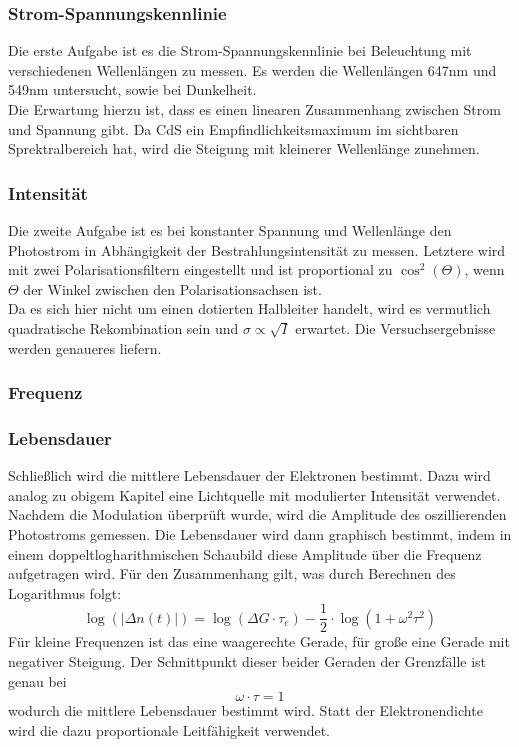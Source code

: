 \subsubsection{Strom-Spannungskennlinie}
Die erste Aufgabe ist es die Strom-Spannungskennlinie bei Beleuchtung mit verschiedenen Wellenlängen zu messen. Es werden die Wellenlängen 647nm und 549nm untersucht, sowie bei Dunkelheit. \\
Die Erwartung hierzu ist, dass es einen linearen Zusammenhang zwischen Strom und Spannung gibt. Da CdS ein Empfindlichkeitsmaximum im sichtbaren Sprektralbereich hat, wird die Steigung mit kleinerer Wellenlänge zunehmen.

\subsubsection{Intensität}
Die zweite Aufgabe ist es bei konstanter Spannung und Wellenlänge den Photostrom in Abhängigkeit der Bestrahlungsintensität zu messen. Letztere wird mit zwei Polarisationsfiltern eingestellt und ist proportional zu $\cos ^{2} (\Theta)$, wenn $\Theta$ der Winkel zwischen den Polarisationsachsen ist. \\
Da es sich hier nicht um einen dotierten Halbleiter handelt, wird es vermutlich quadratische Rekombination sein und $\sigma \propto \sqrt{I}$ erwartet. Die Versuchsergebnisse werden genaueres liefern.

\subsubsection{Frequenz}


\subsubsection{Lebensdauer}
Schließlich wird die mittlere Lebensdauer der Elektronen bestimmt. Dazu wird analog zu obigem Kapitel eine Lichtquelle mit modulierter Intensität verwendet. \\
Nachdem die Modulation überprüft wurde, wird die Amplitude des oszillierenden Photostroms gemessen. Die Lebensdauer wird dann graphisch bestimmt, indem in einem doppeltlogharithmischen Schaubild diese Amplitude über die Frequenz aufgetragen wird. Für den Zusammenhang gilt, was durch Berechnen des Logarithmus folgt:
$$\log (\vert \Delta n(t) \vert) = \log (\Delta G \cdot \tau_e) - \frac{1}{2} \cdot \log (1 + \omega^{2} \tau^{2}) $$
Für kleine Frequenzen ist das eine waagerechte Gerade, für große eine Gerade mit negativer Steigung. Der Schnittpunkt dieser beider Geraden der Grenzfälle ist genau bei
$$\omega \cdot \tau = 1$$
wodurch die mittlere Lebensdauer bestimmt wird. Statt der Elektronendichte wird die dazu proportionale Leitfähigkeit verwendet.

